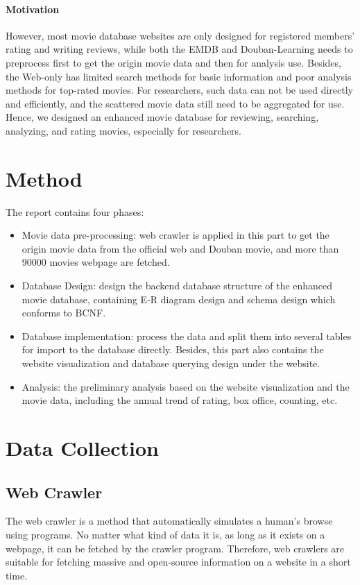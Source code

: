 \documentclass[a4paper]{article}
\begin{document}
\paragraph{Motivation}However, most movie database websites are only designed for registered members' rating and writing reviews, while both the EMDB and Douban-Learning needs to preprocess first to get the origin movie data and then for analysis use. Besides, the Web-only has limited search methods for basic information and poor analysis methods for top-rated movies. For researchers, such data can not be used directly and efficiently, and the scattered movie data still need to be aggregated for use. Hence, we designed an enhanced movie database for reviewing, searching, analyzing, and rating movies, especially for researchers.
  \section{Method}
  The report contains four phases:
  \begin{itemize}
    \item Movie data pre-processing: web crawler is applied in this part to get the origin movie data from the official web and Douban movie, and more than 90000 movies webpage are fetched.
    \item Database Design: design the backend database structure of the enhanced movie database, containing E-R diagram design and schema design which conforms to BCNF\@.
    \item Database implementation: process the data and split them into several tables for import to the database directly. Besides, this part also contains the website visualization and database querying design under the website.
    \item Analysis: the preliminary analysis based on the website visualization and the movie data, including the annual trend of rating, box office, counting, etc.
  \end{itemize}

\section{Data Collection}
  \subsection{Web Crawler}
  The web crawler is a method that automatically simulates a human's browse using programs. No matter what kind of data it is, as long as it exists on a webpage, it can be fetched by the crawler program. Therefore, web crawlers are suitable for fetching massive and open-source information on a website in a short time.
\end{document}
